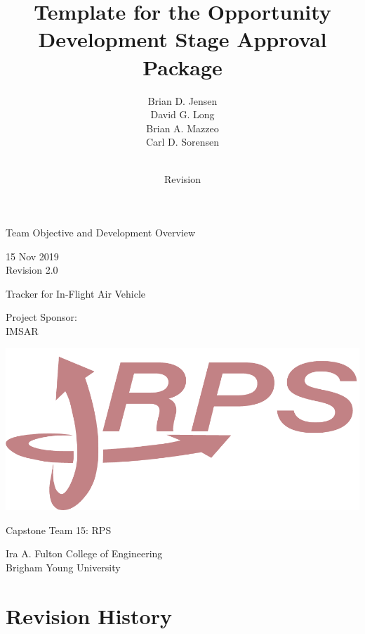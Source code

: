 \documentclass[letterpaper, 11pt, twoside, article]{memoir}
\title{Template for the Opportunity Development Stage Approval Package}
\author{Brian D. Jensen \\ David G. Long \\ Brian A. Mazzeo \\ Carl D. Sorensen }
\date{\revdate \\ Revision \revnum}
\newcommand{\revdate}{15 Nov 2019}
\newcommand{\revnum}{2.0}
\begin{document}
\raggedbottom
\raggedright

\frontmatter




\begin{centering}
\thispagestyle{empty}

{\Huge Team Objective and Development Overview}

\Large
\vspace{0.5in}
\revdate\\
Revision \revnum
\vspace{0.5in}

Tracker for In-Flight Air Vehicle\\
\vspace{0.5in}

Project Sponsor: \\
 IMSAR

\vspace{0.5in}

\includegraphics[width=.2\textwidth]{Images/logo_navy.png}

\vspace{0.4 in}

Capstone Team 15: RPS


\normalsize

\vspace{1.6 in}


\Large

Ira A. Fulton College of Engineering \\
Brigham Young University

\end{centering}


\clearpage

\chapter*{Revision History}
\end{document}
